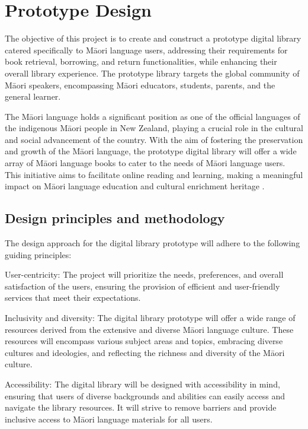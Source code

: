 \chapter{Prototype Design}

The objective of this project is to create and construct a prototype digital library catered specifically to Māori language users, addressing their requirements for book retrieval, borrowing, and return functionalities, while enhancing their overall library experience. The prototype library targets the global community of Māori speakers, encompassing Māori educators, students, parents, and the general learner.

The Māori language holds a significant position as one of the official languages of the indigenous Māori people in New Zealand, playing a crucial role in the cultural and social advancement of the country. With the aim of fostering the preservation and growth of the Māori language, the prototype digital library will offer a wide array of Māori language books to cater to the needs of Māori language users. This initiative aims to facilitate online reading and learning, making a meaningful impact on Māori language education and cultural enrichment heritage \autocite{Discover30:online}.

\section{Design principles and methodology}

The design approach for the digital library prototype will adhere to the following guiding principles:

User-centricity: The project will prioritize the needs, preferences, and overall satisfaction of the users, ensuring the provision of efficient and user-friendly services that meet their expectations.

Inclusivity and diversity: The digital library prototype will offer a wide range of resources derived from the extensive and diverse Māori language culture. These resources will encompass various subject areas and topics, embracing diverse cultures and ideologies, and reflecting the richness and diversity of the Māori culture.

Accessibility: The digital library will be designed with accessibility in mind, ensuring that users of diverse backgrounds and abilities can easily access and navigate the library resources. It will strive to remove barriers and provide inclusive access to Māori language materials for all users.

